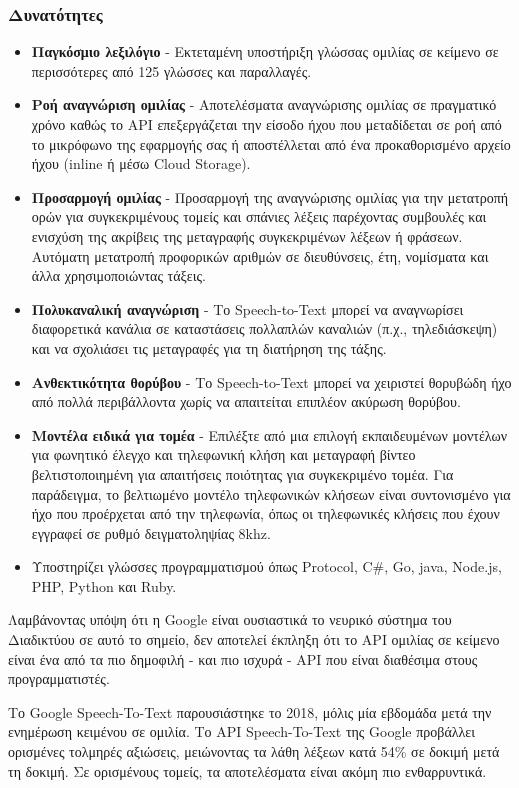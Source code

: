 \documentclass[oneside, 12pt]{book}
\begin{document}
\subsubsection{Δυνατότητες}
\begin{itemize}
  \item \textbf{Παγκόσμιο λεξιλόγιο} - Εκτεταμένη υποστήριξη γλώσσας ομιλίας σε κείμενο σε περισσότερες από 125 γλώσσες και παραλλαγές.
  \item \textbf{Ροή αναγνώριση ομιλίας} - Αποτελέσματα αναγνώρισης ομιλίας σε πραγματικό χρόνο καθώς το API επεξεργάζεται την είσοδο ήχου που μεταδίδεται σε ροή από το μικρόφωνο της εφαρμογής σας ή αποστέλλεται από ένα προκαθορισμένο αρχείο ήχου (inline ή μέσω Cloud Storage).
  \item \textbf{Προσαρμογή ομιλίας} - Προσαρμογή της αναγνώρισης ομιλίας για την μετατροπή ορών για συγκεκριμένους τομείς και σπάνιες λέξεις παρέχοντας συμβουλές και ενισχύση της ακρίβεις της μεταγραφής συγκεκριμένων λέξεων ή φράσεων. Αυτόματη μετατροπή προφορικών αριθμών σε διευθύνσεις, έτη, νομίσματα και άλλα χρησιμοποιώντας τάξεις.
  \item \textbf{Πολυκαναλική αναγνώριση} - Το Speech-to-Text μπορεί να αναγνωρίσει διαφορετικά κανάλια σε καταστάσεις πολλαπλών καναλιών (π.χ., τηλεδιάσκεψη) και να σχολιάσει τις μεταγραφές για τη διατήρηση της τάξης.
  \item \textbf{Ανθεκτικότητα θορύβου} - Το Speech-to-Text μπορεί να χειριστεί θορυβώδη ήχο από πολλά περιβάλλοντα χωρίς να απαιτείται επιπλέον ακύρωση θορύβου.
  \item \textbf{Μοντέλα ειδικά για τομέα} - Επιλέξτε από μια επιλογή εκπαιδευμένων μοντέλων για φωνητικό έλεγχο και τηλεφωνική κλήση και μεταγραφή βίντεο βελτιστοποιημένη για απαιτήσεις ποιότητας για συγκεκριμένο τομέα. Για παράδειγμα, το βελτιωμένο μοντέλο τηλεφωνικών κλήσεων είναι συντονισμένο για ήχο που προέρχεται από την τηλεφωνία, όπως οι τηλεφωνικές κλήσεις που έχουν εγγραφεί σε ρυθμό δειγματοληψίας 8khz.
  \item Υποστηρίζει γλώσσες προγραμματισμού όπως Protocol, C\#, Go, java, Node.js, PHP, Python και Ruby.
\end{itemize}

Λαμβάνοντας υπόψη ότι η Google είναι ουσιαστικά το νευρικό σύστημα του Διαδικτύου σε αυτό το σημείο, δεν αποτελεί έκπληξη ότι το API ομιλίας σε κείμενο είναι ένα από τα πιο δημοφιλή - και πιο ισχυρά - API που είναι διαθέσιμα στους προγραμματιστές.

Το Google Speech-To-Text παρουσιάστηκε το 2018, μόλις μία εβδομάδα μετά την ενημέρωση κειμένου σε ομιλία. Το API Speech-To-Text της Google προβάλλει ορισμένες τολμηρές αξιώσεις, μειώνοντας τα λάθη λέξεων κατά 54\% σε δοκιμή μετά τη δοκιμή. Σε ορισμένους τομείς, τα αποτελέσματα είναι ακόμη πιο ενθαρρυντικά.
\end{document}
